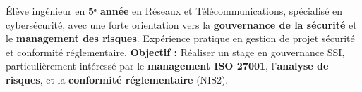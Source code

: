 
\begin{cvparagraph}

    Élève ingénieur en \textbf{5ᵉ année} en Réseaux et Télécommunications, spécialisé en cybersécurité, avec une forte orientation vers la \textbf{gouvernance de la sécurité} et le \textbf{management des risques}. Expérience pratique en gestion de projet sécurité et conformité réglementaire.
    \newline
    \textbf{Objectif :} Réaliser un stage en gouvernance SSI, particulièrement intéressé par le \textbf{management ISO 27001}, l'\textbf{analyse de risques}, et la \textbf{conformité réglementaire} (NIS2).

\end{cvparagraph}